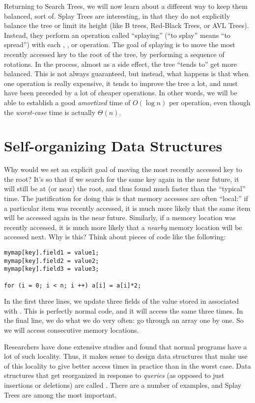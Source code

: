 Returning to Search Trees, we will now learn about a different way to
keep them balanced, sort of. Splay Trees are interesting, in that they
do not explicitly balance the tree or limit its height (like B trees,
Red-Black Trees, or AVL Trees). Instead, they perform an operation called
``splaying'' (``to splay'' means ``to spread'') with each ,
, or  
operation. The goal of splaying is to move the most recently accessed
key to the root of the tree, by performing a sequence of rotations.
In the process, almost as a side effect, the tree ``tends to'' get
more balanced. This is not always guaranteed, but instead, what
happens is that when one operation is really expensive, it tends to
improve the tree a lot, and must have been preceded by a lot of
cheaper operations. In other words, we will be able to establish a
good \emph{amortized} time of $O(\log n)$ per operation, even though
the \emph{worst-case} time is actually $\Theta(n)$.

\section{Self-organizing Data Structures}
Why would we set an explicit goal of moving the most recently accessed
key to the root? It's so that if we search for the same key again in
the near future, it will still be at (or near) the root, and thus
found much faster than the ``typical'' time. The justification for
doing this is that memory accesses are often ``local:'' if a
particular item was recently accessed, it is much more likely that the
same item will be accessed again in the near future. 
Similarly, if a memory location was recently accessed, it is much more
likely that a \emph{nearby} memory location will be accessed next.
Why is this? Think about pieces of code like the following:

\begin{verbatim}
mymap[key].field1 = value1;
mymap[key].field2 = value2;
mymap[key].field3 = value3;

for (i = 0; i < n; i ++) a[i] = a[i]*2;
\end{verbatim}

In the first three lines, we update three fields of the value stored
in  associated with . This is perfectly normal
code, and it will access the same  three times. 
In the final line, we do what we do very often: go through an array
one by one. So we will access consecutive memory locations.

Researchers have done extensive studies and found that normal programs
have a lot of such locality. Thus, it makes sense to design data
structures that make use of this locality to give better access times
in practice than in the worst case. Data structures that get
reorganized in response to \emph{queries} (as opposed to just
insertions or deletions) are called . There are a number of examples, and Splay Trees are
among the most important.

